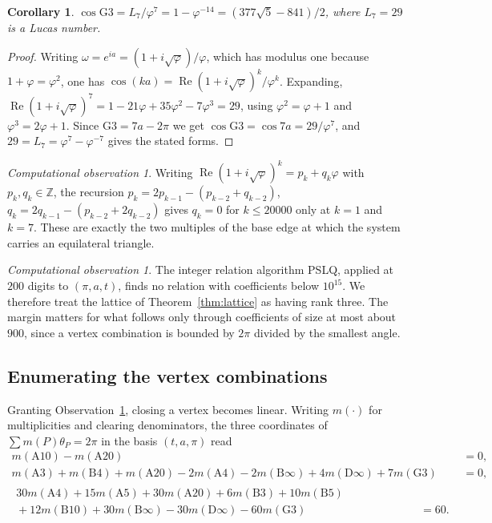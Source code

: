 \documentclass[11pt,a4paper]{article}
\theoremstyle{plain}
\newtheorem{corollary}[theorem]{Corollary}
\theoremstyle{definition}
\theoremstyle{remark}
\newtheorem{observation}[theorem]{Computational observation}
\newcommand{\ZZ}{\mathbb{Z}}
\begin{document}
\begin{corollary}\label{cor:g3}
$\cos\mathrm{G}3=L_7/\varphi^{7}=1-\varphi^{-14}=(377\sqrt5-841)/2$, where
$L_7=29$ is a Lucas number.
\end{corollary}

\begin{proof}
Writing $\omega=e^{ia}=(1+i\sqrt\varphi)/\varphi$, which has modulus one because
$1+\varphi=\varphi^{2}$, one has
$\cos(ka)=\operatorname{Re}(1+i\sqrt\varphi)^{k}/\varphi^{k}$.
Expanding, $\operatorname{Re}(1+i\sqrt\varphi)^{7}=1-21\varphi+35\varphi^{2}-7\varphi^{3}=29$,
using $\varphi^{2}=\varphi+1$ and $\varphi^{3}=2\varphi+1$. Since
$\mathrm{G}3=7a-2\pi$ we get $\cos\mathrm{G}3=\cos7a=29/\varphi^{7}$, and
$29=L_7=\varphi^{7}-\varphi^{-7}$ gives the stated forms.
\end{proof}

\begin{observation}\label{obs:indep}
Writing $\operatorname{Re}(1+i\sqrt\varphi)^{k}=p_k+q_k\varphi$ with
$p_k,q_k\in\ZZ$, the recursion $p_k=2p_{k-1}-(p_{k-2}+q_{k-2})$,
$q_k=2q_{k-1}-(p_{k-2}+2q_{k-2})$ gives $q_k=0$ for $k\le20000$ only at $k=1$ and
$k=7$. These are exactly the two multiples of the base edge at which the system
carries an equilateral triangle.
\end{observation}

\begin{observation}\label{obs:rank}
The integer relation algorithm PSLQ, applied at $200$ digits to
$(\pi,a,t)$, finds no relation with coefficients below $10^{15}$. We therefore
treat the lattice of Theorem~\ref{thm:lattice} as having rank three. The margin
matters for what follows only through coefficients of size at most about $900$,
since a vertex combination is bounded by $2\pi$ divided by the smallest angle.
\end{observation}

\subsection{Enumerating the vertex combinations}

Granting Observation~\ref{obs:rank}, closing a vertex becomes linear. Writing
$m(\cdot)$ for multiplicities and clearing denominators, the three coordinates of
$\sum m(P)\theta_P=2\pi$ in the basis $(t,a,\pi)$ read
\begin{align}
  m(\mathrm{A}10)-m(\mathrm{A}20)&=0,\label{eq:t}\\
  m(\mathrm{A}3)+m(\mathrm{B}4)+m(\mathrm{A}20)-2m(\mathrm{A}4)-2m(\mathrm{B}\infty)
  +4m(\mathrm{D}\infty)+7m(\mathrm{G}3)&=0,\label{eq:a}\\
  \begin{split}
  30m(\mathrm{A}4)+15m(\mathrm{A}5)+30m(\mathrm{A}20)+6m(\mathrm{B}3)+10m(\mathrm{B}5)\hspace{6em}&\\
  {}+12m(\mathrm{B}10)+30m(\mathrm{B}\infty)-30m(\mathrm{D}\infty)-60m(\mathrm{G}3)&=60 .
  \end{split}\label{eq:pi}
\end{align}
\end{document}
